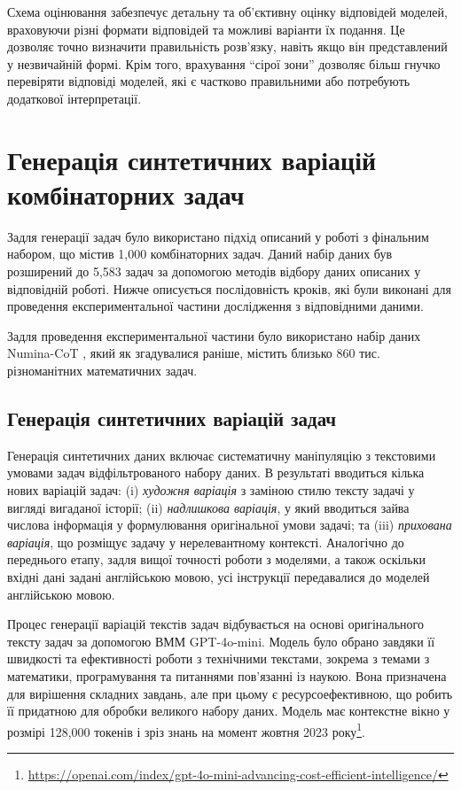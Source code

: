 Схема оцінювання забезпечує детальну та об'єктивну оцінку відповідей моделей, враховуючи різні формати відповідей та можливі варіанти їх подання. Це дозволяє точно визначити правильність розв'язку, навіть якщо він представлений у незвичайній формі. Крім того, врахування ``сірої зони'' дозволяє більш гнучко перевіряти відповіді моделей, які є частково правильними або потребують додаткової інтерпретації.

\section{Генерація синтетичних варіацій комбінаторних задач}

Задля генерації задач було використано підхід описаний у роботі \cite{nikolaiev2025synth} з фінальним набором, що містив 1,000 комбінаторних задач. Даний набір даних був розширений до 5,583 задач за допомогою методів відбору даних описаних у відповідній роботі. Нижче описується послідовність кроків, які були виконані для проведення експериментальної частини дослідження з відповідними даними.

Задля проведення експериментальної частини було використано набір даних Numina-CoT \cite{numina_math_7b}, який як згадувалися раніше, містить близько 860 тис. різноманітних математичних задач.

\subsection{Генерація синтетичних варіацій задач}

Генерація синтетичних даних включає систематичну маніпуляцію з текстовими умовами задач відфільтрованого набору даних. В результаті вводиться кілька нових варіацій задач: (i) \emph{художня варіація} з заміною стилю тексту задачі у вигляді вигаданої історії; (ii) \emph{надлишкова варіація}, у який вводиться зайва числова інформація у формулювання оригінальної умови задачі; та (iii) \emph{прихована варіація}, що розміщує задачу у нерелевантному контексті. Аналогічно до переднього етапу, задля вищої точності роботи з моделями, а також оскільки вхідні дані задані англійською мовою, усі інструкції передавалися до моделей англійською мовою.

Процес генерації варіацій текстів задач відбувається на основі оригінального тексту задач за допомогою ВММ GPT-4o-mini. Модель було обрано завдяки її швидкості та ефективності роботи з технічними текстами, зокрема з темами з математики, програмування та питаннями пов'язанні із наукою. Вона призначена для вирішення складних завдань, але при цьому є ресурсоефективною, що робить її придатною для обробки великого набору даних. Модель має контекстне вікно у розмірі 128,000 токенів і зріз знань на момент жовтня 2023 року\footnote{\url{https://openai.com/index/gpt-4o-mini-advancing-cost-efficient-intelligence/}}.

